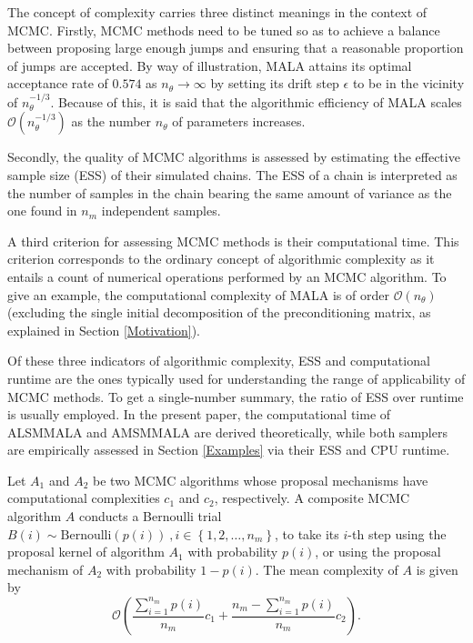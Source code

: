 \documentclass[twoside,11pt]{article}
\begin{document}
The concept of complexity carries three distinct meanings in the context of MCMC. Firstly, MCMC methods need to be tuned so
as to achieve a balance between proposing large enough jumps and ensuring that a reasonable proportion of jumps are accepted.
By way of illustration, MALA attains its optimal acceptance rate of $0.574$ as $n_{\theta}\rightarrow\infty$ by setting its
drift step $\epsilon$ to be in the vicinity of $n_{\theta}^{-1/3}$. Because of this, it is said that the algorithmic
efficiency of MALA scales $\mathcal{O}(n_{\theta}^{-1/3})$ as the number $n_{\theta}$ of parameters increases.

Secondly, the quality of MCMC algorithms is assessed by estimating the effective sample size (ESS) of their simulated chains.
The ESS of a chain is interpreted as the number of samples in the chain bearing the same amount of variance as the one found 
in $n_m$ independent samples.

A third criterion for assessing MCMC methods is their computational time.
This criterion corresponds to the ordinary concept of algorithmic complexity as it entails a count of numerical operations
performed by an MCMC algorithm. To give an example, the computational complexity of MALA is of order $\mathcal{O}(n_{\theta})$ (excluding the single initial decomposition of the  preconditioning matrix, as explained in Section \ref{Motivation}).

Of these three indicators of algorithmic complexity, ESS and computational runtime are the ones typically used for
understanding the range of applicability of MCMC methods. To get a single-number summary, the ratio of ESS over runtime is
usually employed. In the present paper, the computational time of ALSMMALA and AMSMMALA are derived theoretically, while both
samplers are empirically assessed in Section \ref{Examples} via their ESS and CPU runtime.

\begin{proposition}
Let $A_1$ and $A_2$ be two MCMC algorithms whose proposal mechanisms have computational complexities $c_1$ and $c_2$, 
respectively. A composite MCMC algorithm $A$ conducts a Bernoulli trial
$B(i)\sim\mbox{Bernoulli}(p(i))~,i\in\left\{1,2,\dots,n_m\right\}$, to take its $i$-th step using the proposal kernel of 
algorithm $A_1$ with probability $p(i)$, or using the proposal mechanism of $A_2$ with probability $1-p(i)$. The mean 
complexity of $A$ is given by
\begin{equation}
\label{eq:c}
\mathcal{O}\left(
\dfrac{\sum_{i=1}^{n_m}p(i)}{n_m}c_1+\dfrac{n_m-\sum_{i=1}^{n_m}p(i)}{n_m}c_2
\right).
\end{equation}
\end{proposition}
\end{document}
